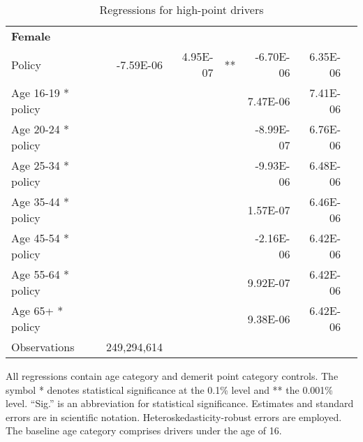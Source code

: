 \begin{table}
\begin{tabular}{l r r l r r l}
\hline 

\textbf{Female} \\ 

Policy             &  -7.59E-06        &  4.95E-07       &   **       &  -6.70E-06        &  6.35E-06       &            \\ 
Age 16-19 * policy           & & &  &  7.47E-06        &  7.41E-06       &            \\ 
Age 20-24 * policy           & & &  &  -8.99E-07        &  6.76E-06       &            \\ 
Age 25-34 * policy           & & &  &  -9.93E-06        &  6.48E-06       &            \\ 
Age 35-44 * policy           & & &  &  1.57E-07        &  6.46E-06       &            \\ 
Age 45-54 * policy           & & &  &  -2.16E-06        &  6.42E-06       &            \\ 
Age 55-64 * policy           & & &  &  9.92E-07        &  6.42E-06       &            \\ 
Age 65+ * policy           & & &  &  9.38E-06        &  6.42E-06       &            \\ 
Observations & 249,294,614 \\ 


\hline 

\end{tabular} 
\caption{Regressions for high-point drivers} 
All regressions contain age category and demerit point category controls. 
The symbol * denotes statistical significance at the 0.1\% level 
and ** the 0.001\% level. 
``Sig.'' is an abbreviation for statistical significance. 
Estimates and standard errors are in scientific notation. 
Heteroskedasticity-robust errors are employed. 
The baseline age category comprises drivers under the age of 16. 
\label{tab:orig_high_pt_regs} 
\end{table} 
 
